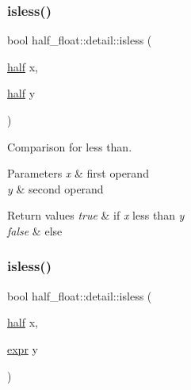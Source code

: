 \subsubsection{\texorpdfstring{isless()}{isless()}\hspace{0.1cm}{\footnotesize\ttfamily [1/4]}}
{\footnotesize\ttfamily bool half\+\_\+float\+::detail\+::isless (\begin{DoxyParamCaption}\item[{\hyperlink{classhalf__float_1_1half}{half}}]{x,  }\item[{\hyperlink{classhalf__float_1_1half}{half}}]{y }\end{DoxyParamCaption})\hspace{0.3cm}{\ttfamily [inline]}}

Comparison for less than. 
\begin{DoxyParams}{Parameters}
{\em x} & first operand \\
\hline
{\em y} & second operand \\
\hline
\end{DoxyParams}

\begin{DoxyRetVals}{Return values}
{\em true} & if {\itshape x} less than {\itshape y} \\
\hline
{\em false} & else \\
\hline
\end{DoxyRetVals}
\mbox{\label{namespacehalf__float_1_1detail_a284488fe5519a429d1834b76bb59d152}} 
\subsubsection{\texorpdfstring{isless()}{isless()}\hspace{0.1cm}{\footnotesize\ttfamily [2/4]}}
{\footnotesize\ttfamily bool half\+\_\+float\+::detail\+::isless (\begin{DoxyParamCaption}\item[{\hyperlink{classhalf__float_1_1half}{half}}]{x,  }\item[{\hyperlink{structhalf__float_1_1detail_1_1expr}{expr}}]{y }\end{DoxyParamCaption})\hspace{0.3cm}{\ttfamily [inline]}}

\mbox{\label{namespacehalf__float_1_1detail_a0bf94752c22c1cdb1273beeb67164e7e}} 
